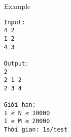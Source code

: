 Example
\begin{verbatim}
Input:
4 2
1 2
4 3

Output:
2
2 1 2
2 3 4

Giới hạn:
1 ≤ N ≤ 10000
1 ≤ M ≤ 20000
Thời gian: 1s/test
\end{verbatim}